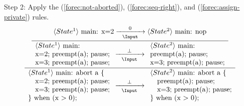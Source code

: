 \noindent
Step 2: Apply the (\ref{forec:not-aborted}), (\ref{forec:seq-right}), 
and (\ref{forec:assign-private}) rules. 
\begin{equation*}
	\frac{
		\dfrac{
				\langle State^1 \rangle ~ \text{main: x=2}
					\xrightarrow[~~\Input~~]{0}
				 \langle State^2 \rangle ~ \text{main: nop}
			}{
				\begin{array}{l}
					\langle State^1 \rangle ~ \text{main:}	\\
					\text{x=2; preempt(a); pause;}			\\
					\text{x=3; preempt(a); pause;}							
				\end{array}
					\xrightarrow[~~\Input~~]{\bot} 
				\begin{array}{l}
					\langle State^2 \rangle ~ \text{main:}	\\
					\text{preempt(a); pause;}				\\
					\text{x=3; preempt(a); pause;}							
				\end{array}
			}
		}{
			\begin{array}{l}
				\langle State^1 \rangle ~ \text{main: abort a \{}	\\
				\text{~~~x=2; preempt(a); pause;}					\\
				\text{~~~x=3; preempt(a); pause;}					\\
				\text{\} when (x > 0);}
			\end{array}
				\xrightarrow[~~\Input~~]{\bot} 
			\begin{array}{l}
				\langle State^2 \rangle ~ \text{main: abort a \{}	\\
				\text{~~~preempt(a); pause;}						\\
				\text{~~~x=3; preempt(a); pause;}					\\
				\text{\} when (x > 0);}
			\end{array}
		}
\end{equation*}

